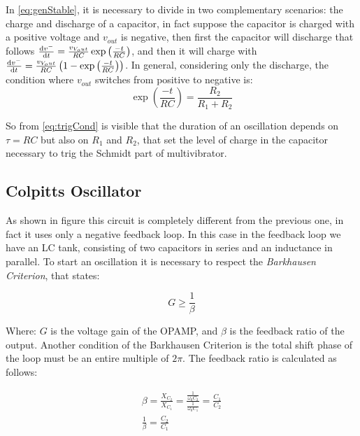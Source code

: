 \documentclass[a4paper, twocolumn]{article}
\begin{document}
In \eqref{eq:genStable}, it is necessary to divide in two complementary scenarios: the charge and discharge of a capacitor, in fact suppose the capacitor is charged with a positive voltage and \(v_{out}\) is negative, then first the capacitor will discharge that follows \(\dv{v^-}{t}= \frac{v_{V_out}}{RC}\exp\left(\frac{-t}{RC}\right)\), and then it will charge with \(\dv{v^-}{t}= \frac{v_{V_out}}{RC}\left(1-\exp\left(\frac{-t}{RC}\right)\right)\). In general, considering only the discharge, the condition where \(v_{out}\) switches from positive to negative is:
\begin{equation}
    \label{eq:trigCond}
    \exp\left(\frac{-t}{RC}\right) = \frac{R_2}{R_1+R_2}
\end{equation}

So from \eqref{eq:trigCond} is visible that the duration of an oscillation depends on \(\tau = RC\) but also on \(R_1\) and \(R_2\), that set the level of charge in the capacitor necessary to trig the Schmidt part of multivibrator.

\subsection{Colpitts Oscillator}

\begin{center}
    \centering
    \def \svgwidth{.95\columnwidth}
    
\end{center}

As shown in figure this circuit is completely different from the previous one, in fact it uses only a negative feedback loop. In this case in the feedback loop we have an LC tank, consisting of two capacitors in series and an inductance in parallel. To start an oscillation it is necessary to respect the \emph{Barkhausen Criterion}, that states:

\begin{equation}
    G \ge \frac{1}{\beta}
\end{equation}

Where: \(G\) is the voltage gain of the OPAMP, and $\beta$ is the feedback ratio of the output. Another condition of the Barkhausen Criterion is the total shift phase of the loop must be an entire multiple of \(2\pi\). 
The feedback ratio is calculated as follows: 

\begin{gather}
        \beta  = \frac{X_{C_2}}{X_{C_1}} = \frac{\frac{1}{\omega_0 C_2}}{\frac{1}{\omega_0 C_1}} = \frac{C_1}{C_2}\\
    \frac{1}{\beta}= \frac{C_2}{C_1}
\end{gather}
\end{document}
